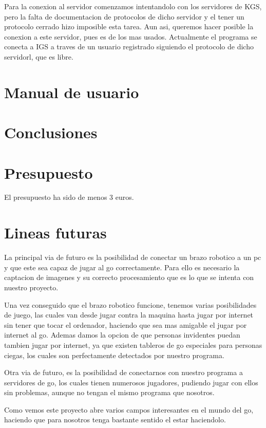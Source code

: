 \documentclass[12pt,a4paper]{report}
\begin{document}
Para la conexion al servidor comenzamos intentandolo con los servidores de KGS, pero la falta de documentacion de protocolos de dicho servidor y el tener un protocolo cerrado hizo imposible esta tarea. Aun asi, queremos hacer posible la conexion a este servidor, pues es de los mas usados. Actualmente el programa se conecta a IGS a traves de un usuario registrado siguiendo el protocolo de dicho servidorl, que es libre.


 
\chapter{Manual de usuario}



\chapter{Conclusiones}


\chapter{Presupuesto}
El presupuesto ha sido de menos 3 euros.

\chapter{Lineas futuras}


La principal via de futuro es la posibilidad de conectar un brazo robotico a un pc y que este sea capaz de jugar al go correctamente. Para ello es necesario la captacion de imagenes y su correcto procesamiento que es lo que se intenta con nuestro proyecto. 

Una vez conseguido que el brazo robotico funcione, tenemos varias posibilidades de juego, las cuales van desde jugar contra la maquina hasta jugar por internet sin tener que tocar el ordenador, haciendo que sea mas amigable el jugar por internet al go. Ademas damos la opcion de que personas invidentes puedan tambien jugar por internet, ya que existen tableros de go especiales para personas ciegas, los cuales son perfectamente detectados por nuestro programa.

Otra via de futuro, es la posibilidad de conectarnos con nuestro programa a servidores de go, los cuales tienen numerosos jugadores, pudiendo jugar con ellos sin problemas, aunque no tengan el mismo programa que nosotros.

Como vemos este proyecto abre varios campos interesantes en el mundo del go, haciendo que para nosotros tenga bastante sentido el estar haciendolo. 
\end{document}
